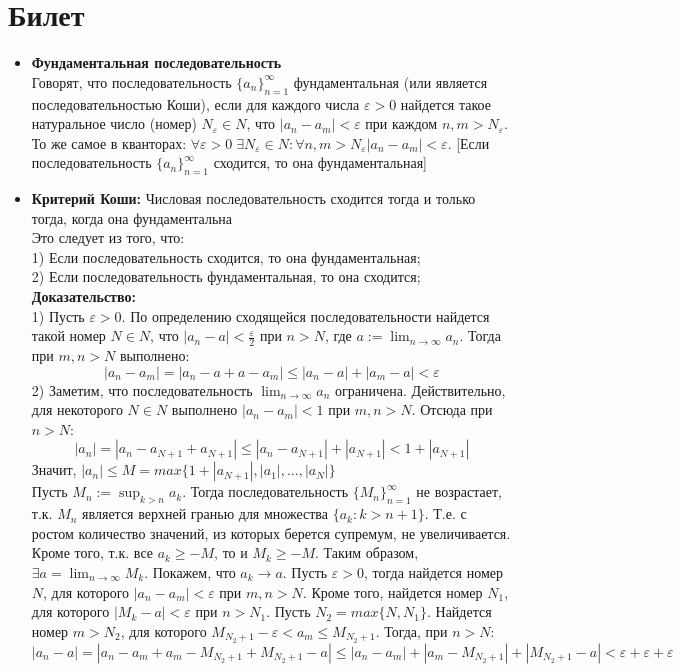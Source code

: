 \documentclass[12pt,a4paper]{article}
\begin{document}
\section{Билет}
\begin{itemize}

\item \textbf{Фундаментальная последовательность} \\
Говорят, что последовательность $\{a_n\}_{n=1}^{\infty}$ фундаментальная (или является последовательностью Коши), если для каждого числа $\varepsilon > 0$ найдется такое натуральное число (номер) $N_{\varepsilon} \in N$, что $|a_n - a_m| < \varepsilon$ при каждом $n, m > N_{\varepsilon}$. То же самое в кванторах: $\forall \varepsilon > 0 \; \exists N_{\varepsilon} \in N: \forall n, m > N_{\varepsilon} |a_n - a_m| < \varepsilon$.
[Если последовательность $\{a_n\}_{n=1}^{\infty}$ сходится, то она фундаментальная]

\item \textbf{Критерий Коши: }Числовая последовательность сходится тогда и только тогда, когда она фундаментальна \\
Это следует из того, что: \\
1) Если последовательность сходится, то она фундаментальная; \\
2) Если последовательность фундаментальная, то она сходится; \\
\textbf{Доказательство:} \\
1) Пусть $\varepsilon > 0$. По определению сходящейся последовательности найдется такой номер $N \in N$, что $|a_n - a| < \frac{\varepsilon}{2}$ при $n > N$, где $a := \lim_{n \to \infty}{a_n}$. Тогда при $m, n > N$ выполнено:
\[
|a_n - a_m| = |a_n - a + a - a_m| \leq |a_n - a| + |a_m - a| < \varepsilon
\]
2) Заметим, что последовательность $\lim_{n \to \infty}{a_n}$ ограничена. Действительно, для некоторого $N \in N$ выполнено $|a_n - a_m| < 1$ при $m, n > N$. Отсюда при $n > N$:
\[
|a_n| = |a_n - a_{N+1} + a_{N+1}| \leq |a_n - a_{N+1}| + |a_{N+1}| < 1 + |a_{N+1}|
\]
Значит, $|a_n| \leq M = max\{1 + |a_{N+1}|,|a_1|, ..., |a_N|\}$ \\
Пусть $M_n := \sup_{k > n}{a_k}$. Тогда последовательность $\{M_n\}_{n=1}^{\infty}$ не возрастает, т.к. $M_n$ является верхней гранью для множества $\{a_k: k > n+1\}$. Т.е. с ростом количество значений, из которых берется супремум, не увеличивается. Кроме того, т.к. все $a_k \geq -M$, то и $M_k \geq -M$. Таким образом, $\exists a = \lim_{n \to \infty}{M_k}$. Покажем, что $a_k \longrightarrow a$. Пусть $\varepsilon > 0$, тогда найдется номер $N$, для которого $|a_n - a_m| < \varepsilon$ при $m, n > N$. Кроме того, найдется номер $N_1$, для которого $|M_k - a| < \varepsilon$ при $n > N_1$. Пусть $N_2 = max\{N, N_1\}$. Найдется номер $m > N_2$, для которого $M_{N_2+1} - \varepsilon < a_m \leq M_{N_2+1}$. Тогда, при $n > N$: \\
$|a_n - a| = |a_n - a_m + a_m - M_{N_2+1} + M_{N_2+1} - a| \leq |a_n - a_m| + |a_m - M_{N_2+1}| + |M_{N_2+1} - a| < \varepsilon + \varepsilon + \varepsilon$


\end{itemize}
\end{document}
